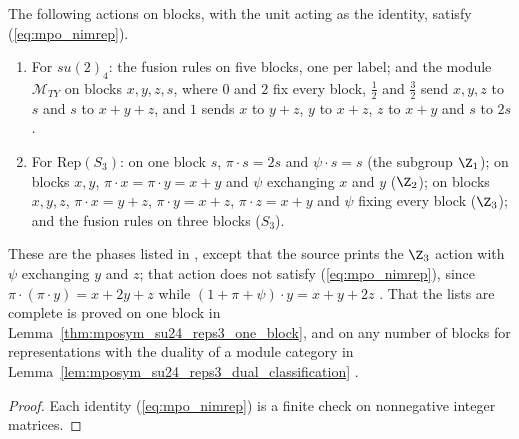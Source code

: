 \begin{lemma}%
    \label{thm:mposym_su24_reps3_nimreps}
    \leanok
    The following actions on blocks, with the unit acting as the identity,
    satisfy (\ref{eq:mpo_nimrep}).
    \begin{enumerate}
        \item For $su(2)_4$: the fusion rules on five blocks, one per label;
              and the module $\mathcal M_{TY}$ on blocks $x,y,z,s$, where $0$
              and $2$ fix every block, $\tfrac12$ and $\tfrac32$ send $x,y,z$
              to $s$ and $s$ to $x+y+z$, and $1$ sends $x$ to $y+z$, $y$ to
              $x+z$, $z$ to $x+y$ and $s$ to $2s$.
        \item For $\mathrm{Rep}(S_3)$: on one block $s$, $\pi\cdot s=2s$ and
              $\psi\cdot s=s$ (the subgroup $\Z_1$); on blocks $x,y$,
              $\pi\cdot x=\pi\cdot y=x+y$ and $\psi$ exchanging $x$ and $y$
              ($\Z_2$); on blocks $x,y,z$, $\pi\cdot x=y+z$, $\pi\cdot y=x+z$,
              $\pi\cdot z=x+y$ and $\psi$ fixing every block ($\Z_3$); and the
              fusion rules on three blocks ($S_3$).
    \end{enumerate}
    These are the phases listed in \cite[Section~6]{GarreRubio2023MPOSym},
    except that the source prints the $\Z_3$ action with $\psi$ exchanging
    $y$ and $z$; that action does not satisfy (\ref{eq:mpo_nimrep}), since
    $\pi\cdot(\pi\cdot y)=x+2y+z$ while $(1+\pi+\psi)\cdot y=x+y+2z$
    \cite{gap:glm23_reps3_z3_table}. That the lists are complete is
    proved on one block in Lemma~\ref{thm:mposym_su24_reps3_one_block},
    and on any number of blocks for representations with the duality of a
    module category in Lemma~\ref{lem:mposym_su24_reps3_dual_classification}
    \cite{gap:glm23_reps3_su24_module_list}.
\end{lemma}

\begin{proof}
    \leanok
    Each identity (\ref{eq:mpo_nimrep}) is a finite check on nonnegative
    integer matrices.
\end{proof}

